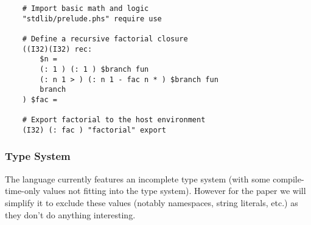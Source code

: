 \documentclass{article}
\begin{document}
    \begin{verbatim}
    # Import basic math and logic
    "stdlib/prelude.phs" require use

    # Define a recursive factorial closure
    ((I32)(I32) rec:
        $n =
        (: 1 ) (: 1 ) $branch fun
        (: n 1 > ) (: n 1 - fac n * ) $branch fun
        branch
    ) $fac =
    
    # Export factorial to the host environment
    (I32) (: fac ) "factorial" export
    \end{verbatim}
    
    
\subsubsection{Type System}
The language currently features an incomplete type system (with some compile-time-only values not fitting into the type system). However for the paper we will simplify it to exclude these values (notably namespaces, string literals, etc.) as they don't do anything interesting.
\end{document}
